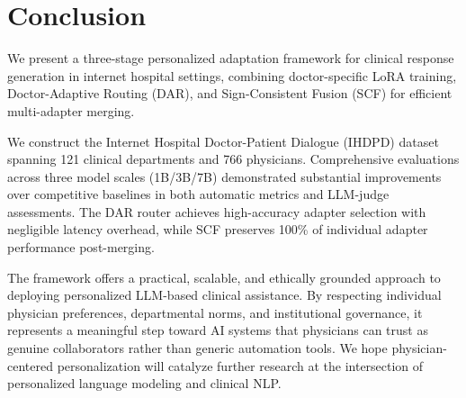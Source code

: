 
\section{Conclusion}

We present a three-stage personalized adaptation framework for clinical response generation in internet hospital settings, combining doctor-specific LoRA training, Doctor-Adaptive Routing (DAR), and Sign-Consistent Fusion (SCF) for efficient multi-adapter merging.

We construct the Internet Hospital Doctor-Patient Dialogue (IHDPD) dataset spanning 121 clinical departments and 766 physicians. Comprehensive evaluations across three model scales (1B/3B/7B) demonstrated substantial improvements over competitive baselines in both automatic metrics and LLM-judge assessments. The DAR router achieves high-accuracy adapter selection with negligible latency overhead, while SCF preserves 100\% of individual adapter performance post-merging.

The framework offers a practical, scalable, and ethically grounded approach to deploying personalized LLM-based clinical assistance. By respecting individual physician preferences, departmental norms, and institutional governance, it represents a meaningful step toward AI systems that physicians can trust as genuine collaborators rather than generic automation tools. We hope physician-centered personalization will catalyze further research at the intersection of personalized language modeling and clinical NLP.
